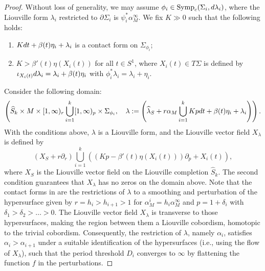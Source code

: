 \documentclass[10pt,a4paper]{amsart}
\def\rd{{\rm d}}
\DeclareMathOperator{\symp}{Symp}
\begin{document}
\begin{proof}
    Without loss of generality, we may assume $\phi_i\in \symp_c(\Sigma_i,\rd \lambda_i)$, where the Liouville form $\lambda_i$ restricted to $\partial \Sigma_i$ is $\psi_i^*\alpha^{\infty}_M$. We fix $K\gg 0$ such that the following holds:
    \begin{enumerate}
        \item $K\rd t + \beta(t)\eta_i+\lambda_i$ is a contact form on $\Sigma_{\phi_i}$;
        \item $K>\beta'(t)\eta(X_i(t))$ for all $t\in S^1$, where $X_i(t)\in T\Sigma$ is defined by $\iota_{X_i(t)}\rd \lambda_i=\lambda_i+\beta(t)\eta_i$ with $\phi_i^*\lambda_i=\lambda_i+\eta_i$.
    \end{enumerate}
    Consider the following domain:
    $$\left(\widehat{S}_k \times M\times [1,\infty)_r \bigcup_{i=1}^k [1,\infty)_p \times \Sigma_{\phi_i}, \quad \lambda:=\left(\widehat{\lambda}_S+r\alpha_M \bigcup_{i=1}^k Kp\rd t + \beta(t)\eta_i+\lambda_i\right)\right).$$
    With the conditions above, $\lambda$ is a Liouville form, and the Liouville vector field $X_\lambda$ is defined by 
    $$\left(X_S+r\partial_r\right) \bigcup_{i=1}^k \left((Kp-\beta'(t)\eta(X_i(t)))\partial_p+X_i(t)\right),$$
    where $X_S$ is the Liouville vector field on the Liouville completion $\widehat{S}_k$. The second condition guarantees that $X_{\lambda}$ has no zeros on the domain above. Note that the contact forms in  are the restrictions of $\lambda$ to a smoothing and perturbation of the hypersurface given by $r=h_i>h_{i+1}>1$ for $\alpha^i_M=h_i\alpha^{\infty}_M$ and $p=1+\delta_i$ with $\delta_1>\delta_2>\ldots >0$. The Liouville vector field $X_\lambda$ is transverse to those hypersurfaces, making the region between them a Liouville cobordism, homotopic to the trivial cobordism. Consequently, the restriction of $\lambda$, namely $\alpha_i$, satisfies $\alpha_i>\alpha_{i+1}$ under a suitable identification of the hypersurfaces (i.e., using the flow of $X_{\lambda}$), such that the period threshold $D_i$ converges to $\infty$ by flattening the function $f$ in the perturbations.
\end{proof}
\end{document}
